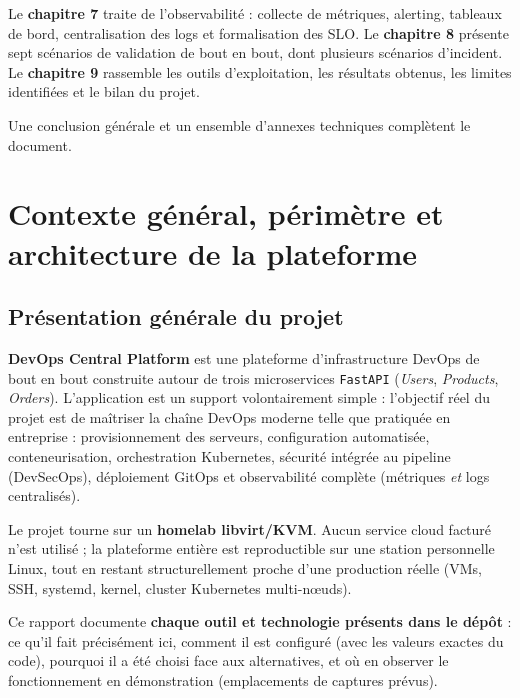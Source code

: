 \documentclass[12pt,a4paper,twoside,openright]{report}
\makeatletter
\def\cleardoublepage{\clearpage\if@twoside
  \ifodd\c@page\else\hbox{}\thispagestyle{empty}\newpage\fi\fi}
\makeatother
\begin{document}
Le \textbf{chapitre 7} traite de l'observabilité : collecte de métriques, alerting,
tableaux de bord, centralisation des logs et formalisation des SLO. Le
\textbf{chapitre 8} présente sept scénarios de validation de bout en bout, dont
plusieurs scénarios d'incident. Le \textbf{chapitre 9} rassemble les outils
d'exploitation, les résultats obtenus, les limites identifiées et le bilan du projet.

Une conclusion générale et un ensemble d'annexes techniques complètent le document.

\cleardoublepage

\chapter[Contexte général et architecture]{Contexte général, périmètre et architecture de la plateforme}

\section{Présentation générale du projet}

\textbf{DevOps Central Platform} est une plateforme d'infrastructure DevOps de bout en bout construite autour de trois microservices \texttt{FastAPI} (\emph{Users}, \emph{Products}, \emph{Orders}). L'application est un support volontairement simple : l'objectif réel du projet est de maîtriser la chaîne DevOps moderne telle que pratiquée en entreprise : provisionnement des serveurs, configuration automatisée, conteneurisation, orchestration Kubernetes, sécurité intégrée au pipeline (DevSecOps), déploiement GitOps et observabilité complète (métriques \emph{et} logs centralisés).

Le projet tourne sur un \textbf{homelab libvirt/KVM}. Aucun service cloud facturé n'est utilisé ; la plateforme entière est reproductible sur une station personnelle Linux, tout en restant structurellement proche d'une production réelle (VMs, SSH, systemd, kernel, cluster Kubernetes multi-nœuds).

Ce rapport documente \textbf{chaque outil et technologie présents dans le dépôt} : ce qu'il fait précisément ici, comment il est configuré (avec les valeurs exactes du code), pourquoi il a été choisi face aux alternatives, et où en observer le fonctionnement en démonstration (emplacements de captures prévus).
\end{document}
